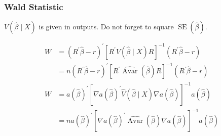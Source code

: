 \subsubsection{Wald Statistic}

$V(\widehat{\beta} \mid X)$ is given in outputs. Do not forget to square $\operatorname{SE}(\hat{\beta})$.

\begin{align*}
    W &=\left(R^{\prime} \widehat{\beta}-r\right)^{\prime}\left[R^{\prime} V(\widehat{\beta} \mid X) R\right]^{-1}\left(R^{\prime} \widehat{\beta}-r\right)\\
    &=n\left(R^{\prime} \widehat{\beta}-r\right)^{\prime}\left[R^{\prime} \hat{\operatorname{Avar}}(\widehat{\beta}) R\right]^{-1}\left(R^{\prime} \widehat{\beta}-r\right)\\
    W&=a(\hat{\beta})^{\prime}\left[\nabla a(\hat{\beta})^{\prime} \hat{V}(\hat{\beta}\mid X) \nabla a(\hat{\beta})\right]^{-1} a(\hat{\beta}) \\
    &= n a(\hat{\beta})^{\prime}\left[\nabla a(\hat{\beta})^{\prime} \hat{\operatorname{Avar}}(\hat{\beta}) \nabla a(\hat{\beta})\right]^{-1} a(\hat{\beta})
\end{align*}

